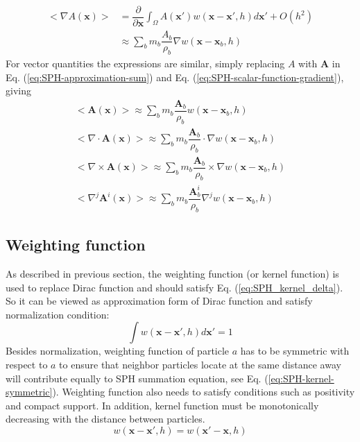 \documentclass[journal abbreviation, manuscript]{copernicus}
\begin{document}
\begin{equation}
\begin{split}
<\nabla A(\textbf{x})> & = \dfrac{\partial }{\partial \textbf{x}} \int_{\Omega} A(\textbf{x} \prime) w(\textbf{x}-\textbf{x}\prime, h) d\textbf{x}\prime + O(h^2) \\
& \approx \sum_b m_b \dfrac{A_b}{\rho_b} \nabla w(\textbf{x} - \textbf{x}_b, h)
\end{split} 
\label{eq:SPH-scalar-function-gradient}
\end{equation}
For vector quantities the expressions are similar, simply replacing $A$ with $\textbf{A}$ in Eq. (\ref{eq:SPH-approximation-sum}) and Eq. (\ref{eq:SPH-scalar-function-gradient}), giving
\begin{align}
<\textbf{A}(\textbf{x})> \approx \sum_b m_b \dfrac{\textbf{A}_b}{\rho_b} w(\textbf{x}-\textbf{x}_b, h) \\
<\nabla \cdot \textbf{A}(\textbf{x})> \approx \sum_b m_b \dfrac{\textbf{A}_b}{\rho_b} \cdot \nabla w(\textbf{x} - \textbf{x}_b, h) \\
<\nabla \times \textbf{A}(\textbf{x})> \approx \sum_b m_b \dfrac{\textbf{A}_b}{\rho_b} \times \nabla w(\textbf{x} - \textbf{x}_b, h) \\
<\nabla^j \textbf{A}^i(\textbf{x})> \approx \sum_b m_b \dfrac{\textbf{A}_b^i}{\rho_b} \nabla^j w(\textbf{x} - \textbf{x}_b, h) 
\label{eq:SPH-vecctor-function}
\end{align}
%

\subsection{Weighting function}
As described in previous section, the weighting function (or kernel function) is used to replace Dirac function and should satisfy Eq.  (\ref{eq:SPH_kernel_delta}). So it can be viewed as approximation form of Dirac function and satisfy normalization condition:
\begin{equation}
\int	 w(\textbf{x}-\textbf{x}\prime, h) d\textbf{x}\prime = 1
\label{eq:SPH-kernel-normalization-prop}
\end{equation}
Besides normalization, weighting function of particle $a$ has to be symmetric with respect to $a$ to ensure that neighbor particles locate at the same distance away will contribute equally to SPH summation equation, see Eq. (\ref{eq:SPH-kernel-symmetric}). Weighting function also needs to satisfy conditions such as positivity and compact support. In addition, kernel function must be monotonically decreasing with the distance between particles.\\
\begin{equation}
w(\textbf{x}- \textbf{x} \prime, h) = w(\textbf{x} \prime - \textbf{x}, h)
\label{eq:SPH-kernel-symmetric}
\end{equation}
\end{document}
